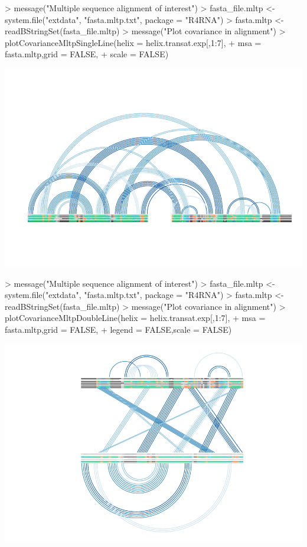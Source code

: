 \documentclass[letterpaper]{article}
\begin{document}
\begin{Schunk}
\begin{Sinput}
> message("Multiple sequence alignment of interest")
> fasta_file.mltp <- system.file("extdata", "fasta.mltp.txt", package = "R4RNA")
> fasta.mltp <- readBStringSet(fasta_file.mltp)
> message("Plot covariance in alignment")
> plotCovarianceMltpSingleLine(helix = helix.transat.exp[,1:7],
+                              msa = fasta.mltp,grid = FALSE,
+                              scale = FALSE)
\end{Sinput}
\end{Schunk}
\includegraphics{R4RNA-017}


\begin{Schunk}
\begin{Sinput}
> message("Multiple sequence alignment of interest")
> fasta_file.mltp <- system.file("extdata", "fasta.mltp.txt", package = "R4RNA")
> fasta.mltp <- readBStringSet(fasta_file.mltp)
> message("Plot covariance in alignment")
> plotCovarianceMltpDoubleLine(helix = helix.transat.exp[,1:7],
+                              msa = fasta.mltp,grid = FALSE,
+                              legend = FALSE,scale = FALSE)
\end{Sinput}
\end{Schunk}
\includegraphics{R4RNA-018}
\end{document}
